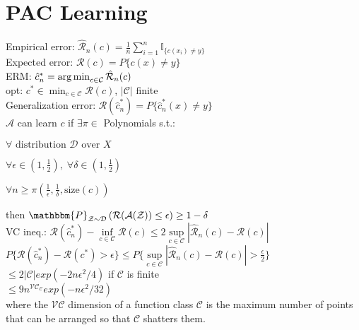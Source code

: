 \section{PAC Learning}
Empirical error: $\hat{\mathcal{R}}_n(c) = \tfrac{1}{n}\sum_{i=1}^n \mathbb{I}_{\{c(x_i)\neq y\}}$ \\
Expected error: $\mathcal{R}(c) = P\{c(x)\neq y\}$ \\
ERM: $\hat{c}_n^* = \operatorname*{arg\,min}_{c\in\mathcal{C}} \hat{\mathcal{R}}_n(c)$ \\
opt: $c^* \in \min_{c\in\mathcal{C}} \mathcal{R}(c)$, $|\mathcal{C}|$ finite \\
Generalization error: $\mathcal{R}(\hat{c}_n^*) = P\{ \hat{c}_n^*(x)\neq y \}$ \\
$\mathcal{A}$ can learn $c$ if $\exists \pi \in$ Polynomials s.t.:\\
\begin{inparaitem}[\color{red}\textbullet]
    \item $\forall \text{ distribution } \mathcal{D} \text{ over } X$ \\
    \item $\forall \epsilon \in (1, \frac{1}{2}),\;\forall \delta \in (1, \frac{1}{2})$ \\
    \item $\forall n \geq \pi(\frac{1}{\epsilon}, \frac{1}{\delta}, \text{size}(c))$\\
\end{inparaitem}
then $\mathbbm{P}_{\mathcal{Z}\sim\mathcal{D}}\left(\mathcal{R}(\mathcal{A}(\mathcal{Z}))\leq \epsilon\right)\geq 1-\delta$\\

VC ineq.: $\mathcal{R}(\hat{c}_n^*) - \inf\limits_{c\in\mathcal{C}}\mathcal{R}(c) \leq 2\sup\limits_{c\in\mathcal{C}}|\hat{\mathcal{R}}_n(c) - \mathcal{R}(c)|$ \\ 
$P\{ \mathcal{R}(\hat{c}_n^*) - \mathcal{R}(c^*) > \epsilon \} \leq P\{ \sup\limits_{c\in\mathcal{C}}|\hat{\mathcal{R}}_n(c) - \mathcal{R}(c)| > \frac{\epsilon}{2} \} $\\
$\leq 2|\mathcal{C}| exp(-2n\epsilon ^2 /4) $ if $\mathcal{C}$ is finite\\
$\leq 9n^{\mathcal{VC}_{\mathcal{C}}}exp(-n\epsilon ^{2} /32)$ \\
where the $\mathcal{VC}$ dimension of a function class $\mathcal{C}$ 
is the maximum number of points that can be arranged so that $\mathcal{C}$ shatters them.
